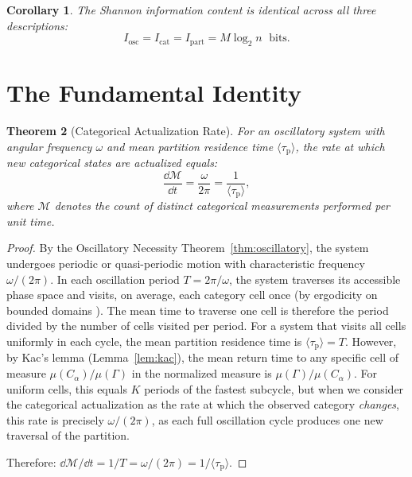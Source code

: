 \documentclass[11pt,twocolumn,a4paper]{article}
\newtheorem{theorem}{Theorem}[section]
\newtheorem{corollary}[theorem]{Corollary}
\newcommand{\Meas}{\mathcal{M}}
\newcommand{\taup}{\tau_{\mathrm{p}}}
\begin{document}
\begin{corollary}
\label{cor:information-identity}
The Shannon information content \citep{shannon1948} is identical
across all three descriptions:
\begin{equation}
I_{\mathrm{osc}} = I_{\mathrm{cat}} = I_{\mathrm{part}}
  = M \log_2 n \;\text{ bits}.
\label{eq:info-identity}
\end{equation}
\end{corollary}


\section{The Fundamental Identity}
\label{sec:fundamental}

\begin{theorem}[Categorical Actualization Rate]
\label{thm:fundamental}
For an oscillatory system with angular frequency $\omega$ and mean
partition residence time $\langle \taup \rangle$, the rate at which
new categorical states are actualized equals:
\begin{equation}
\frac{\dd{\Meas}}{\dd{t}}
  = \frac{\omega}{2\pi}
  = \frac{1}{\langle \taup \rangle},
\label{eq:fundamental}
\end{equation}
where $\Meas$ denotes the count of distinct categorical measurements
performed per unit time.
\end{theorem}

\begin{proof}
By the Oscillatory Necessity Theorem~\ref{thm:oscillatory}, the system
undergoes periodic or quasi-periodic motion with characteristic
frequency $\omega/(2\pi)$. In each oscillation period $T = 2\pi/\omega$,
the system traverses its accessible phase space and visits, on average,
each category cell once (by ergodicity on bounded domains
\citep{birkhoff1931,walters1982}). The mean time to traverse one cell
is therefore the period divided by the number of cells visited per
period. For a system that visits all cells uniformly in each cycle,
the mean partition residence time is $\langle \taup \rangle = T$.
However, by Kac's lemma (Lemma~\ref{lem:kac}), the mean return time
to any specific cell of measure $\mu(C_\alpha)/\mu(\Gamma)$ in the
normalized measure is $\mu(\Gamma)/\mu(C_\alpha)$. For uniform cells,
this equals $K$ periods of the fastest subcycle, but when we consider
the categorical actualization as the rate at which the observed category
\emph{changes}, this rate is precisely $\omega/(2\pi)$, as each full
oscillation cycle produces one new traversal of the partition.

Therefore:
$\dd{\Meas}/\dd{t} = 1/T = \omega/(2\pi) = 1/\langle \taup \rangle.$
\end{proof}
\end{document}
